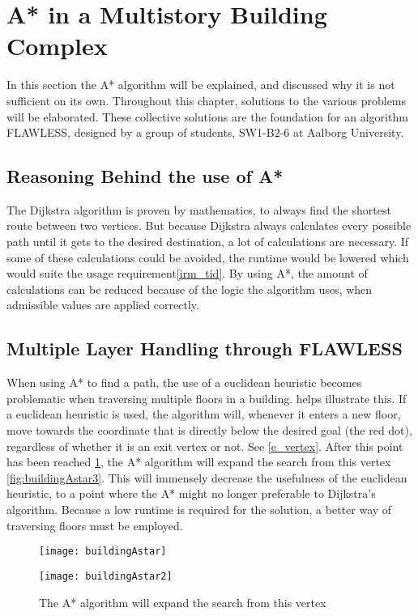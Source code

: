 \section{A* in a Multistory Building Complex}

In this section the A* algorithm will be explained, and discussed why it is not sufficient on its own. Throughout this chapter, solutions to the various problems will be elaborated. These collective solutions are the foundation for an algorithm FLAWLESS, designed by a group of students, SW1-B2-6 at Aalborg University. 

\subsection{Reasoning Behind the use of A*}
The Dijkstra algorithm is proven by mathematics, to always find the shortest route between two vertices. But because Dijkstra always calculates every possible path until it gets to the desired destination, a lot of calculations are necessary. If some of these calculations could be avoided, the runtime would be lowered which would suite the usage requirement\cref{irm_tid}. By using A*, the amount of calculations can be reduced because of the logic the algorithm uses, when admissible values are applied correctly.

\subsection{Multiple Layer Handling through FLAWLESS} \label{multlayhan}

When using A* to find a path, the use of a euclidean heuristic becomes problematic when traversing multiple floors in a building.  helps illustrate this. If a euclidean heuristic is used, the algorithm will, whenever it enters a new floor, move towards the coordinate that is directly below the desired goal (the red dot), regardless of whether it is an exit vertex or not. See \cref{e_vertex}. After this point has been reached \cref{fig:buildingAstar2}, the A* algorithm will expand the search from this vertex \cref{fig:buildingAstar3}. This will immensely decrease the usefulness of the euclidean heuristic, to a point where the A* might no longer preferable to Dijkstra's algorithm. Because a low runtime is required for the solution, a better way of traversing floors must be employed.

\begin{figure}
\centering
  \begin{minipage}{0.45\textwidth}
    \centering
    \texttt{[image: buildingAstar]}
    \caption{Step 1: How the A* algorithm would expand, if using the euclidean distance as heuristic}
    \label{fig:buildingAstar1}
  \end{minipage}
  \hfill
  \begin{minipage}{0.45\textwidth}
    \centering
    \texttt{[image: buildingAstar2]}
    \caption{The A* algorithm will expand the search from this vertex}
    \label{fig:buildingAstar2}
  \end{minipage}
  \end{figure}
  
